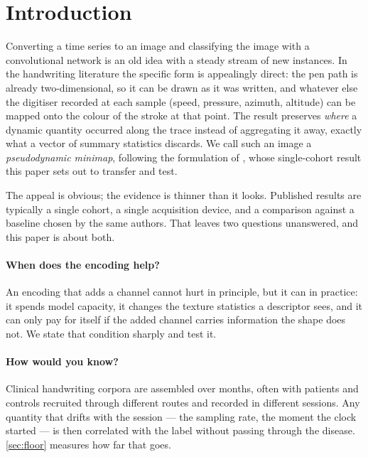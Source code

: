 \documentclass{article}
\begin{document}
\section{Introduction}
\label{sec:intro}

Converting a time series to an image and classifying the image with a convolutional network is an
old idea with a steady stream of new instances. In the handwriting literature the specific form is
appealingly direct: the pen path is already two-dimensional, so it can be drawn as it was written,
and whatever else the digitiser recorded at each sample (speed, pressure, azimuth, altitude) can
be mapped onto the colour of the stroke at that point. The result preserves \emph{where} a dynamic
quantity occurred along the trace instead of aggregating it away, exactly what a vector of summary
statistics discards. We call such an image a \emph{pseudodynamic minimap},
following the formulation of \citet{prior2027minimaps}, whose single-cohort result this paper sets
out to transfer and test.

The appeal is obvious; the evidence is thinner than it looks. Published results are typically a
single cohort, a single acquisition device, and a comparison against a baseline chosen by the same
authors. That leaves two questions unanswered, and this paper is about both.

\paragraph{When does the encoding help?} An encoding that adds a channel cannot hurt in principle,
but it can in practice: it spends model capacity, it changes the texture statistics a descriptor
sees, and it can only pay for itself if the added channel carries information the shape does not.
We state that condition sharply and test it.

\paragraph{How would you know?} Clinical handwriting corpora are assembled over months, often with
patients and controls recruited through different routes and recorded in different sessions. Any
quantity that drifts with the session --- the sampling rate, the moment the clock started --- is
then correlated with the label without passing through the disease. \cref{sec:floor} measures how
far that goes.
\end{document}

